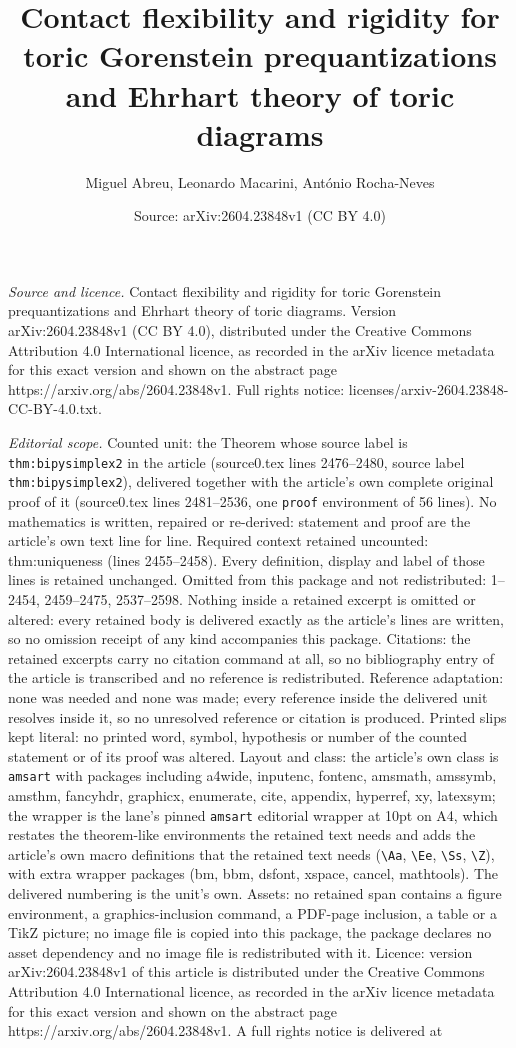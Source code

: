 \documentclass[10pt,a4paper]{amsart}
\title[Contact flexibility and rigidity for toric Gorenstein prequa]{Contact flexibility and rigidity for toric Gorenstein prequantizations and Ehrhart theory of toric diagrams}
\author{Miguel Abreu, Leonardo Macarini, Ant\'onio Rocha-Neves}
\date{Source: arXiv:2604.23848v1 (CC BY 4.0)}
\begin{document}
\maketitle

\noindent\emph{Source and licence.} Contact flexibility and rigidity for toric Gorenstein prequantizations and Ehrhart theory of toric diagrams. Version arXiv:2604.23848v1 (CC BY 4.0), distributed under the Creative Commons Attribution 4.0 International licence, as recorded in the arXiv licence metadata for this exact version and shown on the abstract page https://arxiv.org/abs/2604.23848v1. Full rights notice: licenses/arxiv-2604.23848-CC-BY-4.0.txt.\par\smallskip

\noindent\textit{Editorial scope.} Counted unit: the Theorem whose source label is \texttt{thm:bipysimplex2} in the article (source0.tex lines 2476--2480, source label \texttt{thm:bipysimplex2}), delivered together with the article's own complete original proof of it (source0.tex lines 2481--2536, one \texttt{proof} environment of 56 lines). No mathematics is written, repaired or re-derived: statement and proof are the article's own text line for line. Required context retained uncounted: thm:uniqueness (lines 2455--2458). Every definition, display and label of those lines is retained unchanged. Omitted from this package and not redistributed: 1--2454, 2459--2475, 2537--2598. Nothing inside a retained excerpt is omitted or altered: every retained body is delivered exactly as the article's lines are written, so no omission receipt of any kind accompanies this package. Citations: the retained excerpts carry no citation command at all, so no bibliography entry of the article is transcribed and no reference is redistributed. Reference adaptation: none was needed and none was made; every reference inside the delivered unit resolves inside it, so no unresolved reference or citation is produced. Printed slips kept literal: no printed word, symbol, hypothesis or number of the counted statement or of its proof was altered. Layout and class: the article's own class is \texttt{amsart} with packages including a4wide, inputenc, fontenc, amsmath, amssymb, amsthm, fancyhdr, graphicx, enumerate, cite, appendix, hyperref, xy, latexsym; the wrapper is the lane's pinned \texttt{amsart} editorial wrapper at 10pt on A4, which restates the theorem-like environments the retained text needs and adds the article's own macro definitions that the retained text needs (\texttt{\textbackslash Aa}, \texttt{\textbackslash Ee}, \texttt{\textbackslash Ss}, \texttt{\textbackslash Z}), with extra wrapper packages (bm, bbm, dsfont, xspace, cancel, mathtools). The delivered numbering is the unit's own. Assets: no retained span contains a figure environment, a graphics-inclusion command, a PDF-page inclusion, a table or a TikZ picture; no image file is copied into this package, the package declares no asset dependency and no image file is redistributed with it. Licence: version arXiv:2604.23848v1 of this article is distributed under the Creative Commons Attribution 4.0 International licence, as recorded in the arXiv licence metadata for this exact version and shown on the abstract page https://arxiv.org/abs/2604.23848v1. A full rights notice is delivered at 
\end{document}
